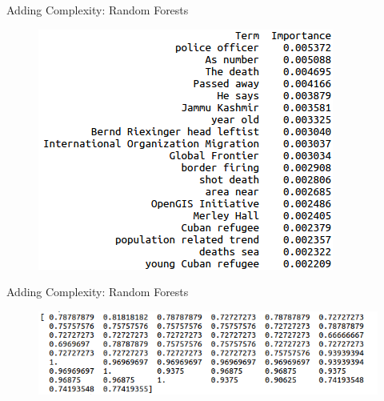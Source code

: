\documentclass{beamer}
\begin{document}
\begin{frame}{Adding Complexity: Random Forests}

\begin{figure}
\centering

\includegraphics[scale=0.5]{randomforestvis.png}
\label{randomforest}

\end{figure}

\end{frame}

\begin{frame}{Adding Complexity: Random Forests}

\begin{figure}
\centering

\includegraphics[scale=0.5]{randomforestscores.png}
\label{randomforest}

\end{figure}

\end{frame}

\end{document}
